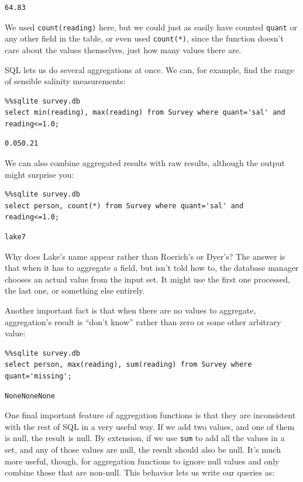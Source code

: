 \documentclass{book}
\begin{document}
\begin{verbatim}
64.83
\end{verbatim}

We used \texttt{count(reading)} here, but we could just as easily have
counted \texttt{quant} or any other field in the table, or even used
\texttt{count(*)}, since the function doesn't care about the values
themselves, just how many values there are.

SQL lets us do several aggregations at once. We can, for example, find
the range of sensible salinity measurements:

\begin{verbatim}
%%sqlite survey.db
select min(reading), max(reading) from Survey where quant='sal' and reading<=1.0;
\end{verbatim}

\begin{verbatim}
0.050.21
\end{verbatim}

We can also combine aggregated results with raw results, although the
output might surprise you:

\begin{verbatim}
%%sqlite survey.db
select person, count(*) from Survey where quant='sal' and reading<=1.0;
\end{verbatim}

\begin{verbatim}
lake7
\end{verbatim}

Why does Lake's name appear rather than Roerich's or Dyer's? The answer
is that when it has to aggregate a field, but isn't told how to, the
database manager chooses an actual value from the input set. It might
use the first one processed, the last one, or something else entirely.

Another important fact is that when there are no values to aggregate,
aggregation's result is ``don't know'' rather than zero or some other
arbitrary value:

\begin{verbatim}
%%sqlite survey.db
select person, max(reading), sum(reading) from Survey where quant='missing';
\end{verbatim}

\begin{verbatim}
NoneNoneNone
\end{verbatim}

One final important feature of aggregation functions is that they are
inconsistent with the rest of SQL in a very useful way. If we add two
values, and one of them is null, the result is null. By extension, if we
use \texttt{sum} to add all the values in a set, and any of those values
are null, the result should also be null. It's much more useful, though,
for aggregation functions to ignore null values and only combine those
that are non-null. This behavior lets us write our queries as:
\end{document}
